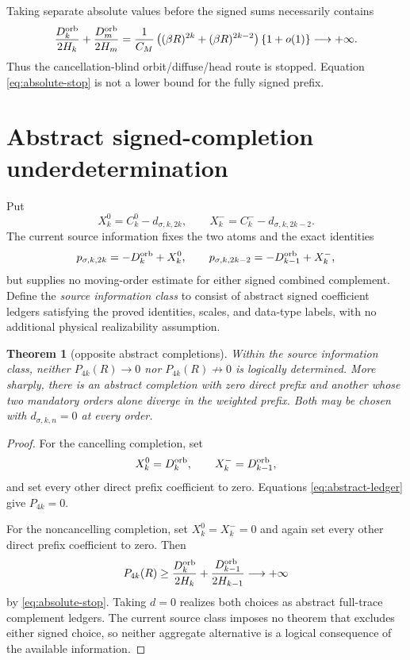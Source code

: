 \documentclass[11pt]{article}
\newtheorem{theorem}{Theorem}[section]
\theoremstyle{remark}
\begin{document}
Taking separate absolute values before the signed sums necessarily contains
\begin{equation}\label{eq:absolute-stop}
 \frac{D_k^{\rm orb}}{2H_k}+\frac{D_m^{\rm orb}}{2H_m}
 =\frac1{C_M}\left((\beta R)^{2k}+(\beta R)^{2k-2}\right)
 \{1+o(1)\}\longrightarrow+\infty.
\end{equation}
Thus the cancellation-blind orbit/diffuse/head route is stopped.  Equation
\eqref{eq:absolute-stop} is not a lower bound for the fully signed prefix.

\section{Abstract signed-completion underdetermination}

Put
\begin{equation}\label{eq:X}
 X_k^0=C_k^0-d_{\sigma,k,2k},
 \qquad X_k^-=C_k^- -d_{\sigma,k,2k-2}.
\end{equation}
The current source information fixes the two atoms and the exact identities
\begin{equation}\label{eq:abstract-ledger}
 p_{\sigma,k,2k}=-D_k^{\rm orb}+X_k^0,
 \qquad
 p_{\sigma,k,2k-2}=-D_{k-1}^{\rm orb}+X_k^-,
\end{equation}
but supplies no moving-order estimate for either signed combined complement.
Define the \emph{source information class} to consist of abstract signed
coefficient ledgers satisfying the proved identities, scales, and data-type
labels, with no additional physical realizability assumption.

\begin{theorem}[opposite abstract completions]
Within the source information class, neither $P_{4k}(R)\to0$ nor
$P_{4k}(R)\not\to0$ is logically determined.  More sharply, there is an
abstract completion with zero direct prefix and another whose two mandatory
orders alone diverge in the weighted prefix.  Both may be chosen with
$d_{\sigma,k,n}=0$ at every order.
\end{theorem}
\begin{proof}
For the cancelling completion, set
\[
 X_k^0=D_k^{\rm orb},
 \qquad X_k^-=D_{k-1}^{\rm orb},
\]
and set every other direct prefix coefficient to zero.  Equations
\eqref{eq:abstract-ledger} give $P_{4k}=0$.

For the noncancelling completion, set $X_k^0=X_k^-=0$ and again set every
other direct prefix coefficient to zero.  Then
\[
 P_{4k}(R)\ge
 \frac{D_k^{\rm orb}}{2H_k}
 +\frac{D_{k-1}^{\rm orb}}{2H_{k-1}}\longrightarrow+\infty
\]
by \eqref{eq:absolute-stop}.  Taking $d=0$ realizes both choices as abstract
full-trace complement ledgers.  The current source class imposes no theorem
that excludes either signed choice, so neither aggregate alternative is a
logical consequence of the available information.
\end{proof}
\end{document}
